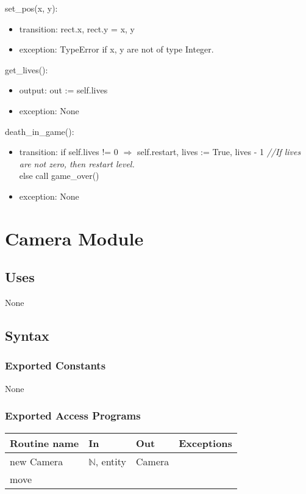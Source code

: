 \documentclass[12pt]{article}
\begin{document}
set\_pos(x, y):
\begin{itemize}
    \item transition: rect.x, rect.y = x, y
    \item exception: TypeError if x, y are not of type Integer.
\end{itemize}

get\_lives():
\begin{itemize}
    \item output: out := self.lives
    \item exception: None
\end{itemize}

death\_in\_game():
\begin{itemize}
    \item transition: if self.lives != 0 $\Rightarrow$ self.restart, lives := True, lives - 1 \emph{//If lives are not zero, then restart level.}\\
    else call game\_over()
    \item exception: None
\end{itemize}

\newpage

\section*{Camera Module}
\subsection*{Uses}
None
\subsection*{Syntax}
\subsubsection*{Exported Constants}
None
\subsubsection*{Exported Access Programs}
\begin{tabular}{| l | l | l | p{5cm} |}
\hline
\textbf{Routine name} & \textbf{In} & \textbf{Out} & \textbf{Exceptions}\\
\hline
new Camera & $\mathbb{N}$, entity & Camera & \\
\hline
move & & &\\
\hline
\end{tabular}
\end{document}
